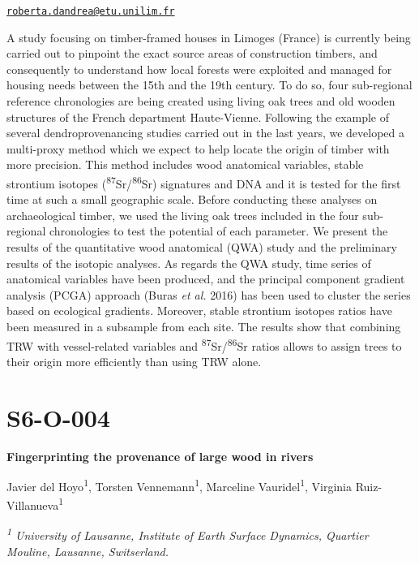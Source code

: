 \documentclass[
]{book}
\begin{document}
\href{mailto:roberta.dandrea@etu.unilim.fr}{\nolinkurl{roberta.dandrea@etu.unilim.fr}}

A study focusing on timber-framed houses in Limoges (France) is currently being carried out to pinpoint the exact source areas of construction timbers, and consequently to understand how local forests were exploited and managed for housing needs between the 15th and the 19th century. To do so, four sub-regional reference chronologies are being created using living oak trees and old wooden structures of the French department Haute-Vienne. Following the example of several dendroprovenancing studies carried out in the last years, we developed a multi-proxy method which we expect to help locate the origin of timber with more precision. This method includes wood anatomical variables, stable strontium isotopes (\textsuperscript{87}Sr/\textsuperscript{86}Sr) signatures and DNA and it is tested for the first time at such a small geographic scale. Before conducting these analyses on archaeological timber, we used the living oak trees included in the four sub-regional chronologies to test the potential of each parameter. We present the results of the quantitative wood anatomical (QWA) study and the preliminary results of the isotopic analyses. As regards the QWA study, time series of anatomical variables have been produced, and the principal component gradient analysis (PCGA) approach (Buras \emph{et al.} 2016) has been used to cluster the series based on ecological gradients. Moreover, stable strontium isotopes ratios have been measured in a subsample from each site. The results show that combining TRW with vessel-related variables and \textsuperscript{87}Sr/\textsuperscript{86}Sr ratios allows to assign trees to their origin more efficiently than using TRW alone.

\hypertarget{s6-o-004}{%
\section*{S6-O-004}\label{s6-o-004}}

\textbf{Fingerprinting the provenance of large wood in rivers}

Javier del Hoyo\textsuperscript{1}, Torsten Vennemann\textsuperscript{1}, Marceline Vauridel\textsuperscript{1}, Virginia Ruiz-Villanueva\textsuperscript{1}

\emph{\textsuperscript{1} University of Lausanne, Institute of Earth Surface Dynamics, Quartier Mouline, Lausanne, Switserland.}
\end{document}
